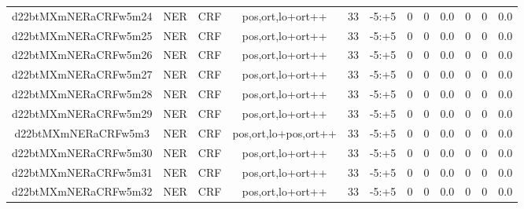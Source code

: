\documentclass[a4paper]{article}
\begin{document}
\begin{landscape}
\begin{center}
\begin{tabular}{ |c|c|c|c|c|c|c|c|c|c|c|c|}
 
 	
 	\small{ d22btMXmNERaCRFw5m24 } & \small{ NER} & \small{  CRF }  & pos,ort,lo+ort++  &  33 &  \small{  -5:+5 }  &  0 & 0 & 0.0  &  0 & 0 & 0.0 \\
 	

 
 	
 	\small{ d22btMXmNERaCRFw5m25 } & \small{ NER} & \small{  CRF }  & pos,ort,lo+ort++  &  33 &  \small{  -5:+5 }  &  0 & 0 & 0.0  &  0 & 0 & 0.0 \\
 	

 
 	
 	\small{ d22btMXmNERaCRFw5m26 } & \small{ NER} & \small{  CRF }  & pos,ort,lo+ort++  &  33 &  \small{  -5:+5 }  &  0 & 0 & 0.0  &  0 & 0 & 0.0 \\
 	

 
 	
 	\small{ d22btMXmNERaCRFw5m27 } & \small{ NER} & \small{  CRF }  & pos,ort,lo+ort++  &  33 &  \small{  -5:+5 }  &  0 & 0 & 0.0  &  0 & 0 & 0.0 \\
 	

 
 	
 	\small{ d22btMXmNERaCRFw5m28 } & \small{ NER} & \small{  CRF }  & pos,ort,lo+ort++  &  33 &  \small{  -5:+5 }  &  0 & 0 & 0.0  &  0 & 0 & 0.0 \\
 	

 
 	
 	\small{ d22btMXmNERaCRFw5m29 } & \small{ NER} & \small{  CRF }  & pos,ort,lo+ort++  &  33 &  \small{  -5:+5 }  &  0 & 0 & 0.0  &  0 & 0 & 0.0 \\
 	

 
 	
 	\small{ d22btMXmNERaCRFw5m3 } & \small{ NER} & \small{  CRF }  & pos,ort,lo+pos,ort++  &  33 &  \small{  -5:+5 }  &  0 & 0 & 0.0  &  0 & 0 & 0.0 \\
 	

 
 	
 	\small{ d22btMXmNERaCRFw5m30 } & \small{ NER} & \small{  CRF }  & pos,ort,lo+ort++  &  33 &  \small{  -5:+5 }  &  0 & 0 & 0.0  &  0 & 0 & 0.0 \\
 	

 
 	
 	\small{ d22btMXmNERaCRFw5m31 } & \small{ NER} & \small{  CRF }  & pos,ort,lo+ort++  &  33 &  \small{  -5:+5 }  &  0 & 0 & 0.0  &  0 & 0 & 0.0 \\
 	

 
 	
 	\small{ d22btMXmNERaCRFw5m32 } & \small{ NER} & \small{  CRF }  & pos,ort,lo+ort++  &  33 &  \small{  -5:+5 }  &  0 & 0 & 0.0  &  0 & 0 & 0.0 \\
 	


\end{tabular}
\end{center}
\end{landscape}
\end{document}

